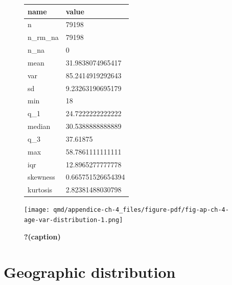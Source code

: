 \documentclass[
  12pt,
  a4paper,
  oneside]{tesesusp}
\begin{document}
\begin{figure}

\caption{\label{fig-ap-ch-4-age-var-distribution-1}\textbf{?(caption)}}

{\centering 

\hypertarget{fig-ap-ch-4-age-var-distribution-1-1}{}
\begin{table}
\centering
\begin{tabular}{l|l}
\hline
name & value\\
\hline
n & 79198\\
\hline
n\_rm\_na & 79198\\
\hline
n\_na & 0\\
\hline
mean & 31.9838074965417\\
\hline
var & 85.2414919292643\\
\hline
sd & 9.23263190695179\\
\hline
min & 18\\
\hline
q\_1 & 24.7222222222222\\
\hline
median & 30.5388888888889\\
\hline
q\_3 & 37.61875\\
\hline
max & 58.7861111111111\\
\hline
iqr & 12.8965277777778\\
\hline
skewness & 0.665751526654394\\
\hline
kurtosis & 2.82381488030798\\
\hline
\end{tabular}
\end{table}

}

\end{figure}

\begin{figure}[H]

\caption{\label{fig-ap-ch-4-age-var-distribution-2}\textbf{?(caption)}}

{\centering \texttt{[image: qmd/appendice-ch-4\_files/figure-pdf/fig-ap-ch-4-age-var-distribution-1.png]}

}

\end{figure}

\hypertarget{geographic-distribution}{%
\section{Geographic distribution}\label{geographic-distribution}}
\end{document}
